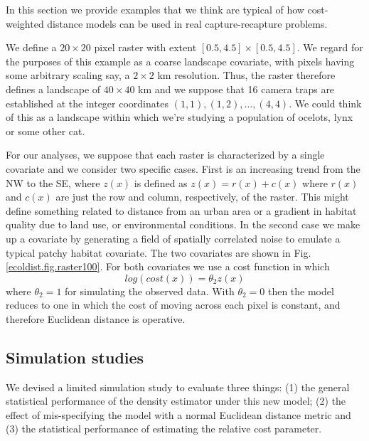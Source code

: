 \documentclass[12pt]{article}
\begin{document}
In this section we provide examples that we think are typical of
how cost-weighted distance models can be used in real
capture-recapture problems.

We define a $20 \times 20$ pixel raster with extent $[0.5, 4.5] \times
[0.5, 4.5]$.  We regard for the purposes of this example as a coarse
landscape covariate, with pixels having some arbitrary scaling say, a
$2 \times 2$ km resolution. Thus, the raster therefore defines a
landscape of $40 \times 40$ km and we suppose that 16 camera traps are
established at the integer coordinates $(1,1), (1,2), \ldots,
(4,4)$. We could think of this as a landscape within which we're
studying a population of ocelots, lynx or some other cat.

For our analyses, we suppose that each raster is characterized by a
single covariate and we consider two specific cases. First is an
increasing trend from the NW to the SE, where $z(x)$ is defined as
$z(x) = r(x) + c(x)$ where $r(x)$ and $c(x)$ are just the row and
column, respectively, of the raster.  This might define something
related to distance from an urban area or a gradient in habitat
quality due to land use, or environmental conditions.  In the second
case we make up a covariate by generating a field of spatially
correlated noise to emulate a typical patchy habitat covariate. The
two covariates are shown in Fig. \ref{ecoldist.fig.raster100}. For
both covariates we use a cost function in which
\[
 log(cost(x))=  \theta_2 z(x)
\]
where $\theta_2 = 1$ for simulating the observed data.
 With $\theta_2=0$ then the
model reduces to one in which the cost of moving across each pixel is
constant, and therefore Euclidean distance is operative.

\subsection{Simulation studies}

We devised a limited simulation study to evaluate three things: (1)
the general statistical performance of the density estimator under
this new model; (2) the effect of mis-specifying the model with a
normal Euclidean distance metric and (3) the statistical performance
of estimating the relative cost parameter.
\end{document}
